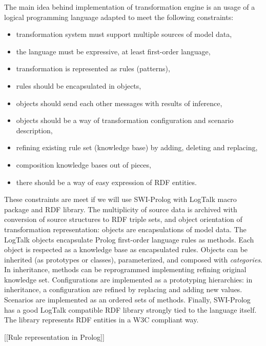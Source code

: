 \documentclass[conference]{IEEEtran}
\begin{document}
The main idea behind implementation of transformation engine is an usage of a logical programming language adapted to meet the following constraints:
\begin{itemize}
\item transformation system must support multiple sources of model data,
\item the language must be expressive, at least first-order language,
\item transformation is represented as rules (patterns),
\item rules should be encapsulated in objects,
\item objects should send each other messages with results of inference,
\item objects should be a way of transformation configuration and scenario description,
\item refining existing rule set (knowledge base) by adding, deleting and replacing,
\item composition knowledge bases out of pieces,
\item there should be a way of easy expression of RDF entities.
\end{itemize}

These constraints are meet if we will use SWI-Prolog with LogTalk macro package and RDF library.  The multiplicity of source data is archived with conversion of source structures to RDF triple sets, and object orientation of transformation representation: objects are encapsulations of model data.  The LogTalk objects encapsulate Prolog first-order language rules as methods.  Each object is respected as a knowledge base as encapsulated rules.  Objects can be inherited (as prototypes or classes), parameterized, and composed with \emph{categories}.  In inheritance, methods can be reprogrammed implementing refining original knowledge set.  Configurations are implemented as a prototyping hierarchies: in inheritance, a configuration are refined by replacing and adding new values.  Scenarios are implemented as an ordered sets of methods.  Finally, SWI-Prolog has a good LogTalk compatible RDF library strongly tied to the language itself.  The library represents RDF entities in a W3C compliant way.

[[Rule representation in Prolog]]

\end{document}
